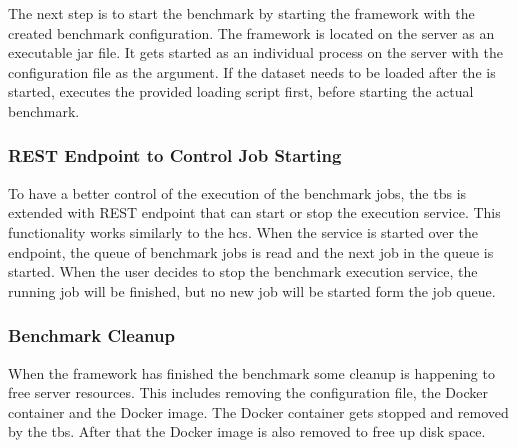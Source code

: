 The next step is to start the benchmark by starting the \iguana{} framework with the created benchmark configuration.
The \iguana{} framework is located on the server as an executable jar file.
It gets started as an individual process on the server with the configuration file as the argument.
If the dataset needs to be loaded after the \ts{} is started, \iguana{} executes the provided loading script first, before starting the actual benchmark.


\subsubsection{REST Endpoint to Control Job Starting}
To have a better control of the execution of the benchmark jobs, the \ac{tbs} is extended with REST endpoint that can start or stop the execution service.
This functionality works similarly to the \ac{hcs}.
When the service is started over the endpoint, the queue of benchmark jobs is read and the next job in the queue is started.
When the user decides to stop the benchmark execution service, the running job will be finished, but no new job will be started form the job queue.


\subsubsection{Benchmark Cleanup}
When the \iguana{} framework has finished the benchmark some cleanup is happening to free server resources.
This includes removing the \iguana{} configuration file, the Docker container and the Docker image.
The Docker container gets stopped and removed by the \ac{tbs}.
After that the Docker image is also removed to free up disk space.
